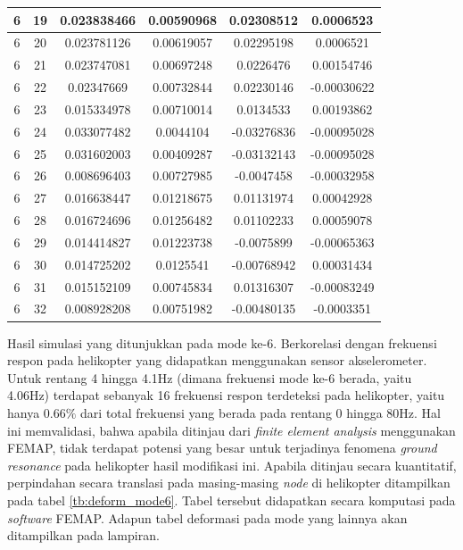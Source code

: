 \begin{table}[h]
{\begin{tabular}{|c|c|c|c|c|c|}
			6 & 19 & 0.023838466 & 0.00590968 & 0.02308512 & 0.0006523 \\ \hline
			6 & 20 & 0.023781126 & 0.00619057 & 0.02295198 & 0.0006521 \\ \hline
			6 & 21 & 0.023747081 & 0.00697248 & 0.0226476 & 0.00154746 \\ \hline
			6 & 22 & 0.02347669 & 0.00732844 & 0.02230146 & -0.00030622 \\ \hline
			6 & 23 & 0.015334978 & 0.00710014 & 0.0134533 & 0.00193862 \\ \hline
			6 & 24 & 0.033077482 & 0.0044104 & -0.03276836 & -0.00095028 \\ \hline
			6 & 25 & 0.031602003 & 0.00409287 & -0.03132143 & -0.00095028 \\ \hline
			6 & 26 & 0.008696403 & 0.00727985 & -0.0047458 & -0.00032958 \\ \hline
			6 & 27 & 0.016638447 & 0.01218675 & 0.01131974 & 0.00042928 \\ \hline
			6 & 28 & 0.016724696 & 0.01256482 & 0.01102233 & 0.00059078 \\ \hline
			6 & 29 & 0.014414827 & 0.01223738 & -0.0075899 & -0.00065363 \\ \hline
			6 & 30 & 0.014725202 & 0.0125541 & -0.00768942 & 0.00031434 \\ \hline
			6 & 31 & 0.015152109 & 0.00745834 & 0.01316307 & -0.00083249 \\ \hline
			6 & 32 & 0.008928208 & 0.00751982 & -0.00480135 & -0.0003351 \\ \hline
		\end{tabular}%
	}
\end{table}

Hasil simulasi yang ditunjukkan pada mode ke-6. Berkorelasi dengan frekuensi respon pada helikopter yang didapatkan menggunakan sensor akselerometer. Untuk rentang 4 hingga 4.1Hz (dimana frekuensi mode ke-6 berada, yaitu 4.06Hz) terdapat sebanyak 16 frekuensi respon terdeteksi pada helikopter, yaitu hanya 0.66$\%$ dari total frekuensi yang berada pada rentang 0 hingga 80Hz. Hal ini memvalidasi, bahwa apabila ditinjau dari \textit{finite element analysis} menggunakan FEMAP, tidak terdapat potensi yang besar untuk terjadinya fenomena \textit{ground resonance} pada helikopter hasil modifikasi ini. Apabila ditinjau secara kuantitatif, perpindahan secara translasi pada masing-masing \textit{node} di helikopter ditampilkan pada tabel \ref{tb:deform_mode6}. Tabel tersebut didapatkan secara komputasi pada \textit{software} FEMAP. Adapun tabel deformasi pada mode yang lainnya akan ditampilkan pada lampiran.